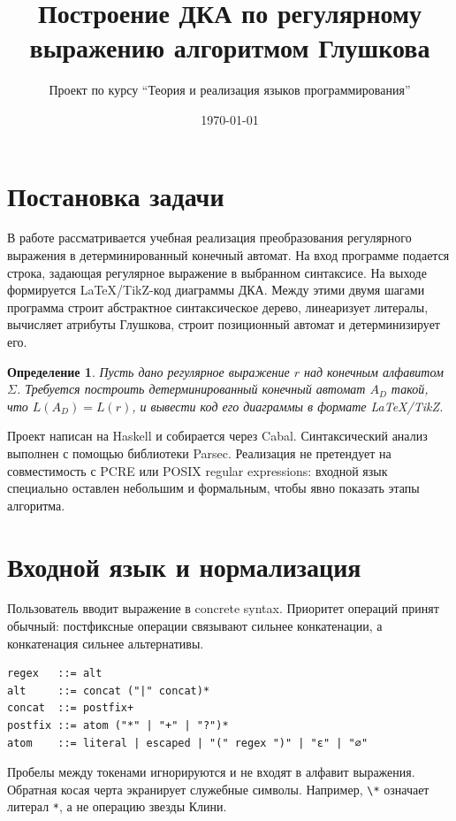 \documentclass[12pt,a4paper]{article}
\title{Построение ДКА по регулярному выражению алгоритмом Глушкова}
\author{Проект по курсу ``Теория и реализация языков программирования''}
\date{\today}
\newtheorem{definition}{Определение}
\begin{document}
\maketitle

\section{Постановка задачи}

В работе рассматривается учебная реализация преобразования регулярного
выражения в детерминированный конечный автомат. На вход программе подается
строка, задающая регулярное выражение в выбранном синтаксисе. На выходе
формируется LaTeX/TikZ-код диаграммы ДКА. Между этими двумя шагами программа
строит абстрактное синтаксическое дерево, линеаризует литералы, вычисляет
атрибуты Глушкова, строит позиционный автомат и детерминизирует его.

\begin{definition}
Пусть дано регулярное выражение $r$ над конечным алфавитом $\Sigma$.
Требуется построить детерминированный конечный автомат $A_D$ такой, что
$L(A_D)=L(r)$, и вывести код его диаграммы в формате LaTeX/TikZ.
\end{definition}

Проект написан на Haskell и собирается через Cabal. Синтаксический анализ
выполнен с помощью библиотеки Parsec. Реализация не претендует на совместимость
с PCRE или POSIX regular expressions: входной язык специально оставлен
небольшим и формальным, чтобы явно показать этапы алгоритма.

\section{Входной язык и нормализация}

Пользователь вводит выражение в concrete syntax. Приоритет операций принят
обычный: постфиксные операции связывают сильнее конкатенации, а конкатенация
сильнее альтернативы.

\begin{verbatim}
regex   ::= alt
alt     ::= concat ("|" concat)*
concat  ::= postfix+
postfix ::= atom ("*" | "+" | "?")*
atom    ::= literal | escaped | "(" regex ")" | "ε" | "∅"
\end{verbatim}

Пробелы между токенами игнорируются и не входят в алфавит выражения. Обратная
косая черта экранирует служебные символы. Например, \verb|\*| означает
литерал \verb|*|, а не операцию звезды Клини.
\end{document}
